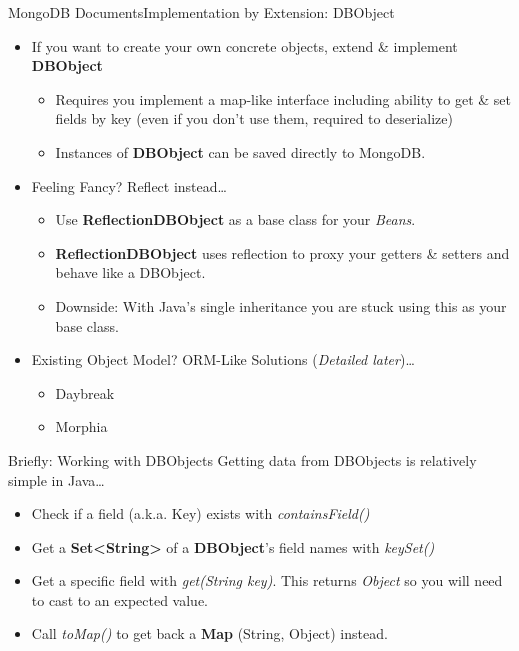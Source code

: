 \documentclass{beamer}
\begin{document}
\begin{frame}{MongoDB Documents}{Implementation by Extension: DBObject}
    \begin{itemize}
        \item<1-> If you want to create your own concrete objects, extend \& implement {\bf DBObject}
            \begin{itemize}
                \item Requires you implement a map-like interface including ability to get \& set fields by key (even if you don't use them, required to deserialize)
                \item Instances of {\bf DBObject} can be saved directly to MongoDB.
            \end{itemize}
        \item<2-> Feeling Fancy? Reflect instead\dots
            \begin{itemize}
                \item Use {\bf ReflectionDBObject} as a base class for your {\em Beans}.
                \item {\bf ReflectionDBObject} uses reflection to proxy your getters \& setters and behave like a DBObject.
                \item Downside: With Java's single inheritance you are stuck using this as your base class.
            \end{itemize}
        \item<3-> Existing Object Model? ORM-Like Solutions (\textsl{Detailed later})\dots
            \begin{itemize}
                \item Daybreak 
                \item Morphia
            \end{itemize}
              
    \end{itemize}
\end{frame}

\begin{frame}{Briefly: Working with DBObjects}
    Getting data from DBObjects is relatively simple in Java\ldots
    \begin{itemize}
        \item<2-> Check if a field (a.k.a. Key) exists with {\em containsField()}
        \item<3-> Get a {\bf Set<String>} of a {\bf DBObject}'s field names with {\em keySet()}
        \item<4-> Get a specific field with {\em get(String key)}.  This returns {\em Object} so you will need to cast to an expected value.
        \item<5-> Call {\em toMap()} to get back a {\bf Map} (String, Object) instead.
    \end{itemize}
\end{frame}
\end{document}
